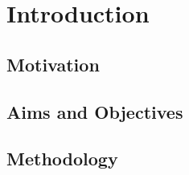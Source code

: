 
\inbpdocument

\chapter{Introduction}
\label{cha:introduction}

\section{Motivation}
\label{sec:motivation}


\section{Aims and Objectives}
\label{sec:objectives}

\section{Methodology}
\label{sec:methodology}


%
%

\outbpdocument{
    
    
}
